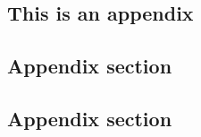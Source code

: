 
\newpage\pagestyle{appendices}
\begin{appendices}

\chapter{This is an appendix}\label{appendix}
\section{Appendix section}

\section{Appendix section}



\end{appendices}